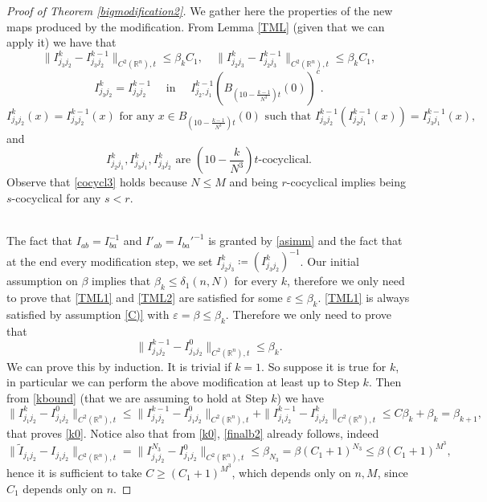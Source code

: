 \documentclass[11pt]{article}
\newcommand{\eps}{\varepsilon}
\newcommand{\rr}{\mathbb{R}}
\theoremstyle{plain}
\theoremstyle{definition}
\numberwithin{equation}{section}
\begin{document}
\begin{proof}[Proof of Theorem \ref{bigmodification2}]
	We gather here the properties of the new maps produced by the modification. From Lemma \ref{TML} (given that we can apply it) we have that 
	\begin{equation}\label{kbound}
		\| I^k_{j_{3}j_{2}}- I^{k-1}_{j_{3}j_{2}}\|_{C^2(\rr^n), t}\le \beta_k C_1,\quad  \| I^k_{j_{2}j_{3}}- I^{k-1}_{j_{2}j_{3}}\|_{C^2(\rr^n), t}\le \beta_k C_1,
	\end{equation}
	\begin{equation}\label{local}
		I^{k}_{j_{3}j_{2}}=I^{k-1}_{j_{3}j_{2}}\quad  \text{  in  } \quad I^{k-1}_{j_{2},j_{1}}(B_{(10-\frac{k-1}{N^3})t}(0))^c.
	\end{equation} 
	\begin{equation}\label{coherence3}
		I^k_{j_3j_2}(x)=I^{k-1}_{j_3j_2}(x) \text{ for any } x \in B_{(10-\frac{k-1}{N^3})t}(0) \text{ such that } I^{k-1}_{j_3j_2}(I^{k-1}_{j_2j_1}(x))=I^{k-1}_{j_3j_1}(x),
	\end{equation}
	and
	\begin{equation}\label{cocycl3}
		I^{k}_{j_{2}j_{1}},I^{k}_{j_{3}j_{1}},I^{k}_{j_{3}j_{2}} \text{ are } \left(10-\frac{k}{N^3}\right)t\text{-cocyclical}.
	\end{equation}
	Observe that \eqref{cocycl3} holds because $N\le M$ and being $r$-cocyclical implies being $s$-cocyclical for any $s<r$.
	
	\medskip 
	
\\
	The fact that $I_{ab}=I_{ba}^{-1}$ and $I'_{ab}=I_{ba}'^{-1}$ is granted by \eqref{asimm} and the fact that at the end every modification step, we set $I^{k}_{j_{2}j_{3}}\coloneqq (I^{k}_{j_{3}j_{2}})^{-1}$.  Our initial assumption on $ \beta$ implies that $\beta_k\le \delta_1(n,N)$ for every $k$, therefore  we only need to prove that \eqref{TML1} and \eqref{TML2} are satisfied for some $\eps\le \beta_k$. \eqref{TML1} is always satisfied by assumption \ref{C)} with $\eps=\beta\le \beta_k$. Therefore we only need to prove that
	\begin{equation}\label{k0}
		\|I^{k-1}_{j_1j_2}-I^0_{j_1j_2}\|_{C^2(\rr^n), t}\le\beta_k.
	\end{equation}
	We can prove this by induction. It is trivial if $k=1$. So suppose it is true for $k$, in particular we can perform the above modification at least up to Step $k$. Then  from \eqref{kbound} (that we are assuming to hold at Step $k$) we have
	\[\|I^{k}_{j_1j_2}-I^0_{j_1j_2}\|_{C^2(\rr^n), t}\le\|I^{k-1}_{j_1j_2}-I^0_{j_1j_2}\|_{C^2(\rr^n), t}+\|I^{k-1}_{j_1j_2}-I^k_{j_1j_2}\|_{C^2(\rr^n), t}\le C\beta_k+\beta_k =\beta_{k+1},\]
	that proves \eqref{k0}. Notice also that from \eqref{k0}, \eqref{finalb2} already follows, indeed
	\[\|\tilde I_{j_1j_2}-I_{j_1j_2}\|_{C^2(\rr^n), t}=\|I^{{N_3}}_{j_1j_2}-I^0_{j_1j_2}\|_{C^2(\rr^n), t}\le \beta_{N_3}= \beta (C_1+1)^{N_3}	\le\beta (C_1+1)^{M^3} ,\]
	hence it is sufficient to take $C\ge (C_1+1)^{M^3}$, which depends only on $n,M$, since $C_1$ depends only on $n$.	
	

\end{proof}
\end{document}
